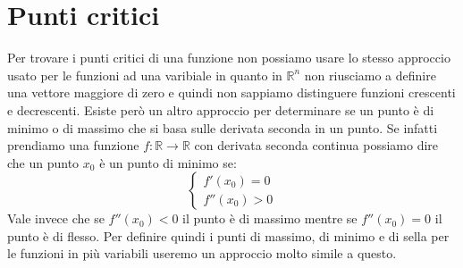 \section{Punti critici}
Per trovare i punti critici di una funzione non possiamo usare lo stesso approccio usato per le funzioni ad una varibiale in quanto in $\mathbb{R}^n$ non riusciamo a definire una vettore maggiore di zero e quindi non sappiamo distinguere funzioni crescenti e decrescenti. Esiste però un altro approccio per determinare se un punto è di minimo o di massimo che si basa sulle derivata seconda in un punto. Se infatti prendiamo una funzione $f: \mathbb{R} \to \mathbb{R}$ con derivata seconda continua possiamo dire che un punto $x_0$ è un punto di minimo se: 
\begin{equation*}
	\begin{cases}
		f'(x_0) = 0\\
		f''(x_0) > 0
	\end{cases}
\end{equation*}
Vale invece che se $f''(x_0) < 0$ il punto è di massimo mentre se $f''(x_0) = 0$ il punto è di flesso. Per definire quindi i punti di massimo, di minimo e di sella per le funzioni in più variabili useremo un approccio molto simile a questo.

